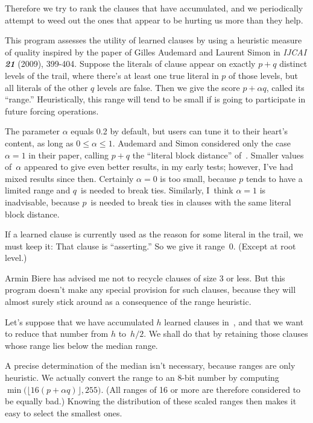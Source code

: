 Therefore we try to rank the clauses that have accumulated, and we
periodically attempt to weed out the ones that appear to be hurting us more
than they help.

This program assesses the utility of learned clauses by using a
heuristic measure of quality inspired by the paper of
Gilles Audemard and Laurent Simon in {\sl IJCAI\/ \bf21} (2009), 399-404.
Suppose the literals of clause  appear on exactly $p+q$ distinct levels
of
the trail, where there's at least one true literal in $p$ of those levels,
but all literals of the other $q$ levels are false. Then we give  the
score $p+\alpha q$, called its ``range.''
Heuristically, this range will tend to be small if
 is going to participate in future forcing operations.

The parameter $\alpha$ equals 0.2 by default, but users can tune it to
their heart's content, as long as $0\le\alpha\le1$.
Audemard and Simon considered only the case $\alpha=1$
in their paper, calling $p+q$ the ``literal block distance'' of~.
Smaller values of~$\alpha$ appeared to give even better results, in
my early tests; however, I've had mixed results since then.
Certainly $\alpha=0$ is too small, because $p$ tends to have a limited range
and $q$~is needed to break ties. Similarly, I~think $\alpha=1$ is inadvisable,
because $p$~is needed to break ties in clauses with the same literal
block distance.

If a learned clause is currently used as the reason for some literal in the
trail, we must keep it: That clause is ``asserting.'' So we give it
range~0. (Except at root level.)

Armin Biere has advised me not to recycle clauses of size 3 or less.
But this program doesn't make any special provision for such clauses,
because they will almost surely stick around as a consequence of the
range heuristic.

Let's suppose that we
have accumulated $h$ learned clauses in~, and that we want
to reduce that number from $h$ to~$h/2$. We shall do that by retaining
those clauses whose range lies below the median range.

A precise determination of the median isn't necessary, because ranges are
only heuristic. We actually convert the range to an 8-bit number by computing
$\min\bigl(\lfloor16(p+\alpha q)\rfloor,255\bigr)$. (All ranges of 16 or more
are therefore considered to be equally bad.) Knowing the distribution of these
scaled ranges then makes it easy to select the smallest ones.

